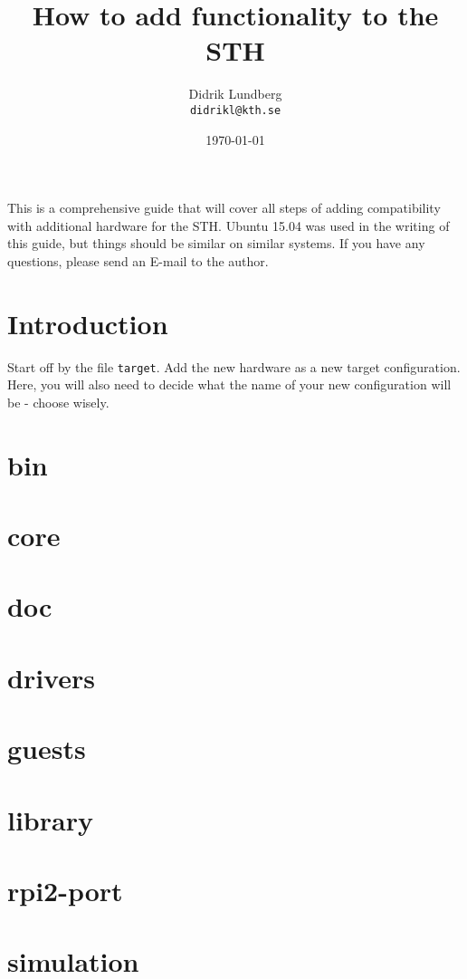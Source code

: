 \documentclass[a4paper,11pt,reqno]{amsart}
\title{How to add functionality to the STH}
\author{Didrik Lundberg\\
\texttt{didrikl@kth.se}}
\date{\today}
\begin{document}
\maketitle
\noindent
This is a comprehensive guide that will cover all steps of adding compatibility with additional hardware for the STH. Ubuntu 15.04 was used in the writing of this guide, but things should be similar on similar systems. If you have any questions, please send an E-mail to the author.
\section{Introduction}

Start off by the file \texttt{target}. Add the new hardware as a new target configuration. Here, you will also need to decide what the name of your new configuration will be - choose wisely.

\section{bin}

\section{core}

\section{doc}

\section{drivers}

\section{guests}

\section{library}

\section{rpi2-port}

\section{simulation}
\end{document}
